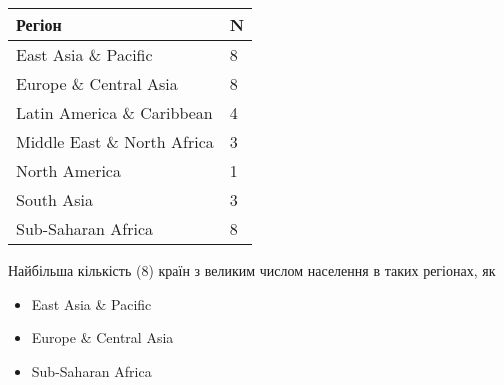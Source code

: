 \documentclass[
]{article}
\providecommand{\tightlist}{%
  \setlength{\itemsep}{0pt}\setlength{\parskip}{0pt}}
\begin{document}
\begin{longtable}[]{@{}ll@{}}
\toprule
\begin{minipage}[b]{0.18\columnwidth}\raggedright
Регіон\strut
\end{minipage} & \begin{minipage}[b]{0.05\columnwidth}\raggedright
N\strut
\end{minipage}\tabularnewline
\midrule
\endhead
\begin{minipage}[t]{0.18\columnwidth}\raggedright
East Asia \& Pacific\strut
\end{minipage} & \begin{minipage}[t]{0.05\columnwidth}\raggedright
8\strut
\end{minipage}\tabularnewline
\begin{minipage}[t]{0.18\columnwidth}\raggedright
Europe \& Central Asia\strut
\end{minipage} & \begin{minipage}[t]{0.05\columnwidth}\raggedright
8\strut
\end{minipage}\tabularnewline
\begin{minipage}[t]{0.18\columnwidth}\raggedright
Latin America \& Caribbean\strut
\end{minipage} & \begin{minipage}[t]{0.05\columnwidth}\raggedright
4\strut
\end{minipage}\tabularnewline
\begin{minipage}[t]{0.18\columnwidth}\raggedright
Middle East \& North Africa\strut
\end{minipage} & \begin{minipage}[t]{0.05\columnwidth}\raggedright
3\strut
\end{minipage}\tabularnewline
\begin{minipage}[t]{0.18\columnwidth}\raggedright
North America\strut
\end{minipage} & \begin{minipage}[t]{0.05\columnwidth}\raggedright
1\strut
\end{minipage}\tabularnewline
\begin{minipage}[t]{0.18\columnwidth}\raggedright
South Asia\strut
\end{minipage} & \begin{minipage}[t]{0.05\columnwidth}\raggedright
3\strut
\end{minipage}\tabularnewline
\begin{minipage}[t]{0.18\columnwidth}\raggedright
Sub-Saharan Africa\strut
\end{minipage} & \begin{minipage}[t]{0.05\columnwidth}\raggedright
8\strut
\end{minipage}\tabularnewline
\bottomrule
\end{longtable}

Найбільша кількість (8) країн з великим числом населення в таких
регіонах, як

\begin{itemize}
\tightlist
\item
  East Asia \& Pacific
\item
  Europe \& Central Asia
\item
  Sub-Saharan Africa
\end{itemize}
\end{document}
